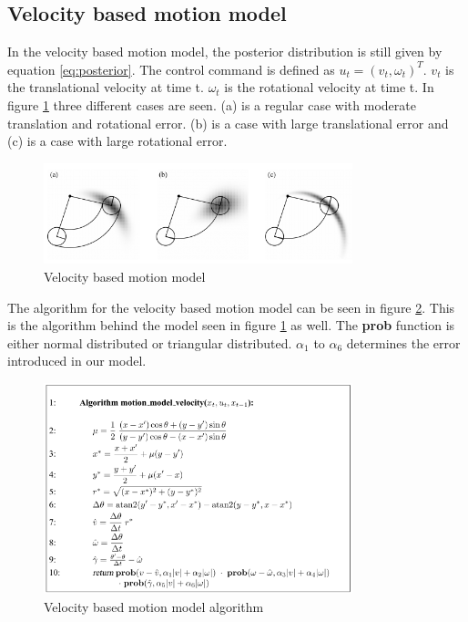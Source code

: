 \subsection{Velocity based motion model}
In the velocity based motion model, the posterior distribution is still given by equation \ref{eq:posterior}. The control command is defined as $u_t = (v_t, \omega_t )^T $. $v_t$ is the translational velocity at time t. $\omega_t$ is the rotational velocity at time t. In figure \ref{fig:velocmod} three different cases are seen. (a) is a regular case with moderate translation and rotational error. (b) is a case with large translational error and (c) is a case with large rotational error.
\begin{figure}[H]
\centering
\includegraphics[width=0.8\textwidth]{billeder/velocmod}
\caption{Velocity based motion model}
\label{fig:velocmod}
\end{figure}
The algorithm for the velocity based motion model can be seen in figure \ref{fig:motionmodelalgo}. This is the algorithm behind the model seen in figure \ref{fig:velocmod} as well. The \textbf{prob} function is either normal distributed or triangular distributed. $\alpha_1$ to $\alpha_6$ determines the error introduced in our model.
\begin{figure}[H]
\centering
\includegraphics[width=0.8\textwidth]{billeder/motionmodelalgo}
\caption{Velocity based motion model algorithm}
\label{fig:motionmodelalgo}
\end{figure}
